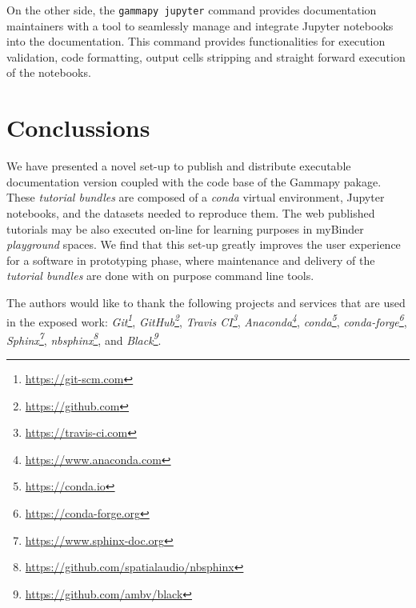 \documentclass[11pt,twoside]{article}
\begin{document}
On the other side, the {\tt gammapy jupyter} command  provides documentation maintainers with a tool to seamlessly manage and integrate Jupyter notebooks into the documentation. This command provides functionalities for execution validation, code formatting, output cells stripping and straight forward execution of the notebooks. 



\section{Conclussions}
We have presented a novel set-up to publish and distribute executable documentation version coupled with the code base of the Gammapy pakage. These \textit{tutorial bundles} are composed of a \textit{conda} virtual environment, Jupyter notebooks, and the datasets needed to reproduce them. The web published tutorials may be also executed on-line for learning purposes in myBinder \textit{playground} spaces. We find that this set-up greatly improves the user experience for a software in prototyping phase, where maintenance and delivery of the \textit{tutorial bundles} are done with on purpose command line tools. 

\acknowledgements The authors would like to thank the following projects and services that are used in the exposed work:  \textit{Git\footnote{\url{https://git-scm.com}}}, \textit{GitHub\footnote{\url{https://github.com}}}, \textit{Travis CI\footnote{\url{https://travis-ci.com}}}, \textit{Anaconda\footnote{\url{https://www.anaconda.com}}}, \textit{conda\footnote{\url{https://conda.io}}}, \textit{conda-forge\footnote{\url{https://conda-forge.org}}}, \textit{Sphinx\footnote{\url{https://www.sphinx-doc.org}}}, \textit{nbsphinx\footnote{\url{https://github.com/spatialaudio/nbsphinx}}}, and \textit{Black\footnote{\url{https://github.com/ambv/black}}}.


\end{document}
